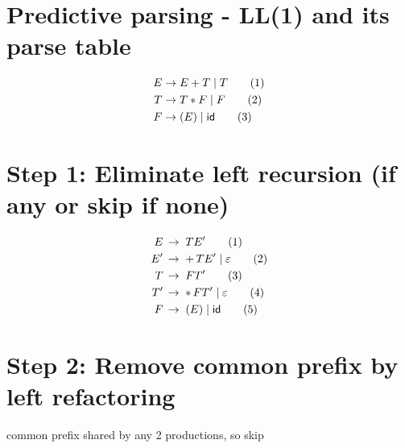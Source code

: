 \section*{Predictive parsing - LL(1) and its parse table}
\begin{align*}
  E \to\;& E + T \;|\; T         \tag{1} \\
  T \to\;& T * F \;|\; F         \tag{2} \\
  F \to\;& (E) \;|\; \mathsf{id} \tag{3}
\end{align*}
\section*{Step 1: Eliminate left recursion (if any or skip if none)}
\begin{align*}
  E\,  & \to\; TE'                     \tag{1} \\
  E'\, & \to\; +\,TE' \;|\; \varepsilon \tag{2} \\
  T\,  & \to\; FT'                     \tag{3} \\
  T'\, & \to\; *\,FT' \;|\; \varepsilon \tag{4} \\
  F\,  & \to\; (E)    \;|\; \mathsf{id} \tag{5}
\end{align*}
\section*{Step 2: Remove common prefix by left refactoring}
 common prefix shared by any 2 productions, so skip

